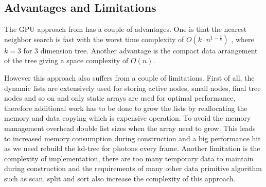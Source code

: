 \subsection{Advantages and Limitations}
The GPU approach from \citeauthor{Zhou2008} has a couple of advantages. One is that the nearest neighbor search is fast with the worst time complexity of \(O(k\cdot n^{1-\frac{1}{k}})\) \cite{Lee1977}, where \(k = 3\) for 3 dimension tree. Another advantage is the compact data arrangement of the tree giving a space complexity of \(O(n)\). 

However this approach also suffers from a couple of limitations. First of all, the dynamic lists are extensively used for storing active nodes, small nodes, final tree nodes and so on and only static arrays are used for optimal performance, therefore additional work has to be done to grow the lists by reallocating the memory and data copying which is expensive operation. To avoid the memory management overhead \citeauthor{Zhou2008} double list sizes when the array need to grow. This leads to increased memory consumption during construction and a big performance hit as we need rebuild the kd-tree for photons every frame. Another limitation is the complexity of implementation, there are too many temporary data to maintain during construction and the requirements of many other data primitive algorithm such as scan, split and sort also increase the complexity of this approach. 

